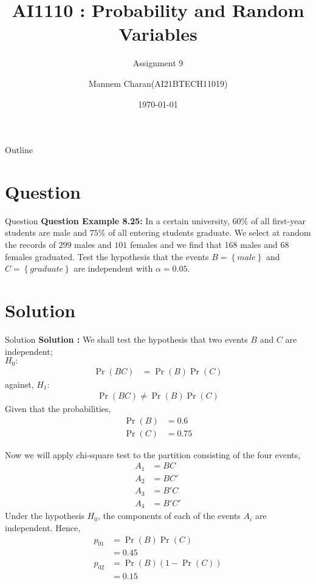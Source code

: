 \documentclass{beamer}
\title{AI1110 : Probability and Random Variables}
\subtitle{Assignment 9}
\author{Mannem Charan(AI21BTECH11019)}
\date{\today}
\providecommand{\pr}[1]{\ensuremath{\Pr\left(#1\right)}}
\providecommand{\brak}[1]{\ensuremath{\left(#1\right)}}
\providecommand{\cbrak}[1]{\ensuremath{\left\{#1\right\}}}
\begin{document}
\begin{frame}
    \titlepage 
\end{frame}


\begin{frame}{Outline}
    \tableofcontents
\end{frame}


\section{Question}
\begin{frame}{Question}
\textbf{Question Example 8.25:}  In a certain university, $60\%$ of all first-year students are male and $75\%$ of all entering
students graduate. We select at random the records of $299$ males and $101$ females and we find that 168 males and 68 females graduated. Test the hypothesis that the events $B = \cbrak{male}$ and $C = \cbrak{graduate}$ are independent with $\alpha = 0.05$. 


\end{frame}

\section{Solution}
\begin{frame}{Solution}
\textbf{Solution :}
We shall test the hypothesis that two events $B$ and $C$ are independent;\\
             $H_{0}:$
       \begin{align}
           \pr{BC} &= \pr{B}\pr{C} 
       \end{align}
   against, $H_{1}:$
       \begin{align}
          \pr{BC}  \neq \pr{B}\pr{C}
       \end{align}
Given that the probabilities,
        \begin{align}
           \pr{B} &= 0.6\\
           \pr{C} &= 0.75
         \end{align}
\end{frame}

\begin{frame}
Now we will apply chi-square test to the partition consisting of the four events,
             \begin{align}
               A_{1} &= BC\\
              A_{2} &= BC'\\
               A_{3} &= B'C\\
              A_{4} &= B'C'
            \end{align}
     Under the hypothesis $H_{0}$, the components of each of the events $A_{i}$ are independent. Hence,
            \begin{align}
              p_{01} &= \pr{B}\pr{C}\\
                           &= 0.45\\
             p_{02} &= \pr{B}\brak{1-\pr{C}}\\
                          &= 0.15\\
            \end{align}
  \end{frame}
\end{document}
